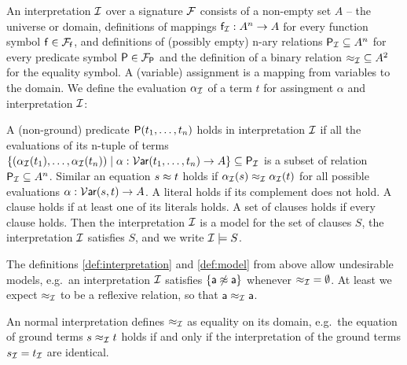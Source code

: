 \begin{definition}\label{def:interpretation}
	An {\myem interpretation} ${\mathcal I}$ over a signature ${\mathcal F}$ consists of a
	non-empty set $A$ -- the {\myem universe} or {\myem domain},
	definitions of mappings ${\mathsf f}_{\mathcal I}: A^n\rightarrow A$ for every function symbol ${\mathsf f}\in{{\mathcal F}_{\mathsf f}}$, 
	and definitions of (possibly empty) n-ary relations 
	 ${{\mathsf P}_{\mathcal I}}\subseteq A^n$ for every predicate symbol ${\mathsf P}\in{{\mathcal F}_{\mathsf P}}$
	 and the definition of a binary relation ${\approx_{\mathcal I}}\subseteq A^2$ for the equality symbol.
	 A (variable) {\myem assignment} is a mapping from variables to the domain.
	 We define the {\myem evaluation} $\alpha_{\mathcal I}$ of a term $t$ 
	 for assingment $\alpha$ and interpretation ${\mathcal I}$:
\end{definition}
\begin{definition}\label{def:model}
	A (non-ground) predicate ${\mathsf P}(t_1,\ldots,t_n)$ 
	{\myem holds} in interpretation ${\mathcal I}$  
	if all the evaluations of its n-tuple of terms 
	$\{ 
	(\alpha_{\mathcal I}({t_1}),\ldots,\alpha_{\mathcal I}({t_n}))
	\mid \alpha : \operatorname{\mathcal{V}\mathsf{ar}}(t_1,\ldots,t_n) \to A \} \subseteq{\mathsf P}_{\mathcal I}$
	is a subset of relation ${\mathsf P}_{\mathcal I}\subseteq A^n$.
	Similar an equation $s\approx t$ holds if $\alpha_{\mathcal I}(s) \approx_{\mathcal I} \alpha_{\mathcal I}(t)$ 
	for all possible evaluations $\alpha: \operatorname{\mathcal{V}\mathsf{ar}}(s,t) \to A$. 
	A literal holds
	if its complement does not hold.
	A clause holds if at least one of its literals holds.
	A set of clauses holds if every clause holds.
	Then the interpretation ${\mathcal I}$ is a model {\myem for} the set of clauses $S$, 
	the interpretation ${\mathcal I}$ satisfies $S$, and
	we write ${\mathcal I}\models S$. 
\end{definition}

\begin{example}The definitions \ref{def:interpretation} and \ref{def:model} 
	from above allow undesirable models, 
	e.g.~an interpretation ${\mathcal I}$ satisfies $\{ {\mathsf a}\not\approx{\mathsf a} \}$ 
		whenever ${\approx_{\mathcal I}} = \emptyset$.
	At least we expect $\approx_{\mathcal I}$ to be a reflexive relation, so that ${\mathsf a}\approx_{\mathcal I}{\mathsf a}$.
\end{example}

\begin{definition}
	An {\myem normal} interpretation defines $\approx_{\mathcal I}$ as equality on its domain,
	e.g.~the equation of ground terms $s \approx_{\mathcal I} t$ holds if and only 
	if the interpretation of the ground terms $s_{\mathcal I} = t_{\mathcal I}$ are identical.
\end{definition}

